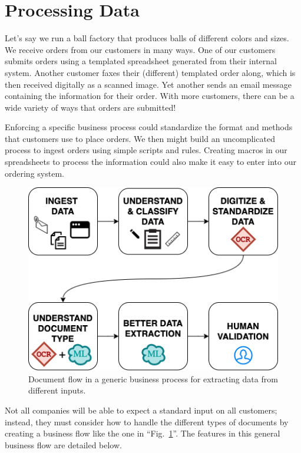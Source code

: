 \documentclass[conference]{IEEEtran}
\begin{document}
\section{Processing Data} \label{sectionProcessingData}

Let's say we run a ball factory that produces balls of different colors and sizes. We receive orders from our customers in many ways. One of our customers submits orders using a templated spreadsheet generated from their internal system. Another customer faxes their (different) templated order along, which is then received digitally as a scanned image. Yet another sends an email message containing the information for their order. With more customers, there can be a wide variety of ways that orders are submitted!

Enforcing a specific business process could standardize the format and methods that customers use to place orders. We then might build an uncomplicated process to ingest orders using simple scripts and rules. Creating macros in our spreadsheets to process the information could also make it easy to enter into our ordering system.

\begin{figure}[ht]
\centerline{\includegraphics[width=\columnwidth]{HighLevelFlow.png}}
\caption{Document flow in a generic business process for extracting data from different inputs.}
\label{figHighLevelFlow}
\end{figure}

Not all companies will be able to expect a standard input on all customers; instead, they must consider how to handle the different types of documents by creating a business flow like the one in ``Fig.~\ref{figHighLevelFlow}''. The features in this general business flow are detailed below.
\end{document}
